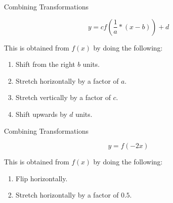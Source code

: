 \begin{example}{}{Combining Transformations}
	
	\[
		y = cf(\frac{1}{a} * (x-b)) + d
	\]
	
	This is obtained from \(f(x)\) by doing the following:
	\begin{enumerate}
		\item Shift from the right \(b\) units.
		\item Stretch horizontally by a factor of \(a\).
		\item Stretch vertically by a factor of \(c\).
		\item Shift upwards by \(d\) units.
	\end{enumerate}
	
\end{example}
\addtocounter{TransformationsCounter}{1}
\begin{example}{}{Combining Transformations}
	
	\[
	y = f(-2x)
	\]
	
	This is obtained from \(f(x)\) by doing the following:
	\begin{enumerate}
		\item Flip horizontally.
		\item Stretch horizontally by a factor of \(0.5\).
	\end{enumerate}
	
\end{example}
\addtocounter{TransformationsCounter}{1}



